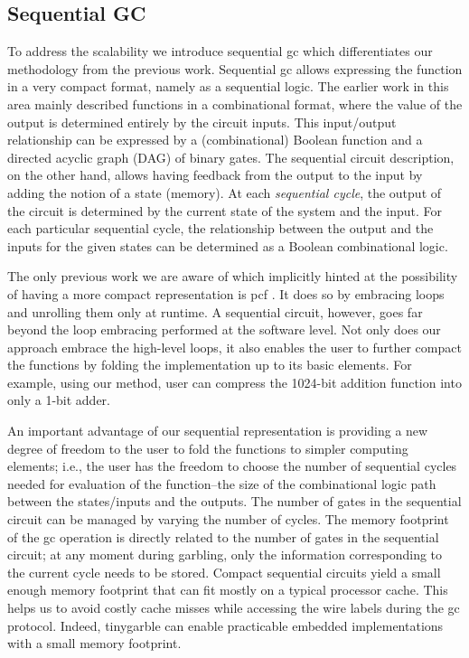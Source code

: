 \subsection{Sequential GC}
To address the scalability we introduce sequential gc which differentiates our methodology from the previous work.
Sequential gc allows expressing the function in a very compact format, namely as a sequential logic.
The earlier work in this area mainly described functions in a combinational format, where the value of the output is determined entirely by the circuit inputs.
This input/output relationship can be expressed by a (combinational) Boolean function and a directed acyclic graph (DAG) of binary gates.
The sequential circuit description, on the other hand, allows having feedback from the output to the input by adding the notion of a state (memory).
At each \emph{sequential cycle}, the output of the circuit is determined by the current state of the system and the input.
For each particular sequential cycle, the relationship between the output and the inputs for the given states can be determined as a Boolean combinational logic.

The only previous work we are aware of which implicitly hinted at the possibility of having a more compact representation is \gls{pcf} \cite{kreuter2013pcf}.
It does so by embracing loops and unrolling them only at runtime.
A sequential circuit, however, goes far beyond the loop embracing performed at the software level.
Not only does our approach embrace the high-level loops, it also enables the user to further compact the functions by folding the implementation up to its basic elements.
For example, using our method, user can compress the 1024-bit addition function into only a 1-bit adder.

An important advantage of our sequential representation is providing a new degree of freedom to the user to fold the functions to simpler computing elements; i.e., the user has the freedom to choose the number of sequential cycles needed for evaluation of the function--the size of the combinational logic path between the states/inputs and the outputs.
The number of gates in the sequential circuit can be managed by varying the number of cycles.
The memory footprint of the \acrshort{gc} operation is directly related to the number of gates in the sequential circuit; at any moment during garbling, only the information corresponding to the current cycle needs to be stored.
Compact sequential circuits yield a small enough memory footprint that can fit mostly on a typical processor cache.
This helps us to avoid costly cache misses while accessing the wire labels during the \acrshort{gc} protocol.
Indeed, \gls{tinygarble} can enable practicable embedded implementations with a small memory footprint.


